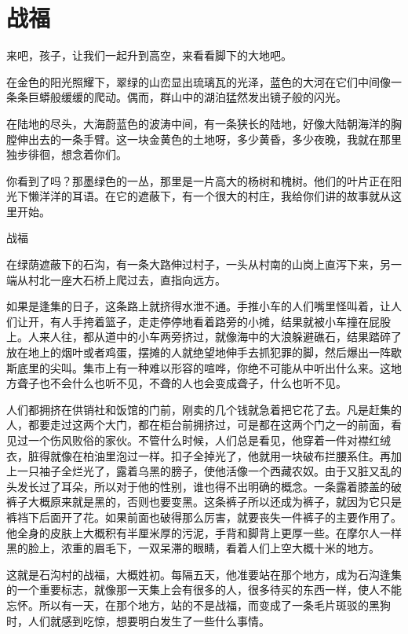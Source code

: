 \chapter{战福}

来吧，孩子，让我们一起升到高空，来看看脚下的大地吧。 

在金色的阳光照耀下，翠绿的山峦显出琉璃瓦的光泽，蓝色的大河在它们中间像一条条巨蟒般缓缓的爬动。偶而，群山中的湖泊猛然发出镜子般的闪光。 

在陆地的尽头，大海蔚蓝色的波涛中间，有一条狭长的陆地，好像大陆朝海洋的胸膛伸出去的一条手臂。这一块金黄色的土地呀，多少黄昏，多少夜晚，我就在那里独步徘徊，想念着你们。 

你看到了吗？那墨绿色的一丛，那里是一片高大的杨树和槐树。他们的叶片正在阳光下懒洋洋的耳语。在它的遮蔽下，有一个很大的村庄，我给你们讲的故事就从这里开始。 


战福 

在绿荫遮蔽下的石沟，有一条大路伸过村子，一头从村南的山岗上直泻下来，另一端从村北一座大石桥上爬过去，直指向远方。 

如果是逢集的日子，这条路上就挤得水泄不通。手推小车的人们嘴里怪叫着，让人们让开，有人手挎着篮子，走走停停地看着路旁的小摊，结果就被小车撞在屁股上。人来人往，都从道中的小车两旁挤过，就像海中的大浪躲避礁石，结果踏碎了放在地上的烟叶或者鸡蛋，摆摊的人就绝望地伸手去抓犯罪的脚，然后爆出一阵歇斯底里的尖叫。集市上有一种难以形容的喧哗，你绝不可能从中听出什么来。这地方聋子也不会什么也听不见，不聋的人也会变成聋子，什么也听不见。 

人们都拥挤在供销社和饭馆的门前，刚卖的几个钱就急着把它花了去。凡是赶集的人，都要走过这两个大门，都在柜台前拥挤过，可是都在这两个门之一的前面，看见过一个伤风败俗的家伙。不管什么时候，人们总是看见，他穿着一件对襟红绒衣，脏得就像在柏油里泡过一样。扣子全掉光了，他就用一块破布拦腰系住。再加上一只袖子全烂光了，露着乌黑的膀子，使他活像一个西藏农奴。由于又脏又乱的头发长过了耳朵，所以对于他的性别，谁也得不出明确的概念。一条露着膝盖的破裤子大概原来就是黑的，否则也要变黑。这条裤子所以还成为裤子，就因为它只是裤裆下后面开了花。如果前面也破得那么厉害，就要丧失一件裤子的主要作用了。他全身的皮肤上大概积有半厘米厚的污泥，手背和脚背上更厚一些。在摩尔人一样黑的脸上，浓重的眉毛下，一双呆滞的眼睛，看着人们上空大概十米的地方。 

这就是石沟村的战福，大概姓初。每隔五天，他准要站在那个地方，成为石沟逢集的一个重要标志，就像那一天集上会有很多的人，很多待买的东西一样，使人不能忘怀。所以有一天，在那个地方，站的不是战福，而变成了一条毛片斑驳的黑狗时，人们就感到吃惊，想要明白发生了一些什么事情。 

